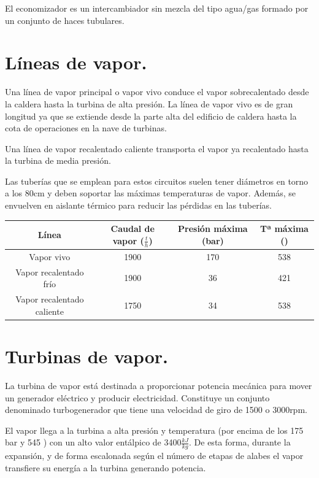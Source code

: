 El economizador es un intercambiador sin mezcla del tipo agua/gas formado por un conjunto de
haces tubulares.

\section{Líneas de vapor.}
Una línea de vapor principal o vapor vivo conduce el vapor sobrecalentado desde la caldera hasta la turbina
de alta presión. La línea de vapor vivo es de gran longitud ya que se extiende desde la parte alta del
edificio de caldera hasta la cota de operaciones en la nave de turbinas.



Una línea de vapor recalentado caliente transporta el vapor ya recalentado hasta la turbina de media presión.



Las tuberías que se emplean para estos circuitos suelen tener diámetros en torno a los 80cm y deben soportar las máximas temperaturas de vapor. Además, se envuelven en aislante térmico para reducir las pérdidas en las tuberías.

\begin{table}[H]
	\centering
	\renewcommand{\arraystretch}{1.5}
	\begin{tabular}{cccc}
		\hline
		Línea&Caudal de vapor ($\frac{t}{h}$)&Presión máxima (bar)&Tª máxima (\grado)\\
		\hline
		Vapor vivo&1900&170&538\\
		\hline
		Vapor recalentado frío&1900&36&421\\
		\hline
		Vapor recalentado caliente&1750&34&538\\
		\hline
	\end{tabular}
\end{table}
\section{Turbinas de vapor.}
La turbina de vapor está destinada a proporcionar potencia mecánica para
mover un generador eléctrico y producir electricidad. Constituye un conjunto denominado
turbogenerador que tiene una velocidad de giro de 1500 o 3000rpm.


El vapor llega a la turbina a alta presión y temperatura (por encima de los 175 bar y 545 \grado) con un alto valor entálpico de 3400$\frac{kJ}{kg}$. De esta forma, durante la expansión, y de forma escalonada según el número de etapas de alabes el vapor transfiere su energía a la turbina generando potencia. 






